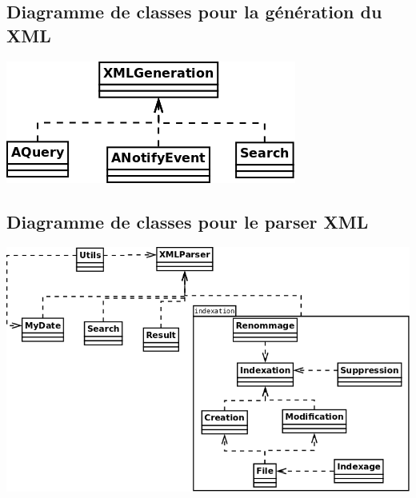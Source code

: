 \documentclass[a4paper,12pt]{report}
\begin{document}
\subsection{Diagramme de classes pour la génération du XML}
\begin{center}
\includegraphics[scale=0.4]{"images/diagramme_classes_xmlgeneration"}
\end{center}

\newpage
\subsection{Diagramme de classes pour le parser XML}
\begin{center}
\includegraphics[scale=0.3]{"images/diagramme_classes_xmlparser"}
\end{center}

\clearpage
{}
\printindex
\end{document}
